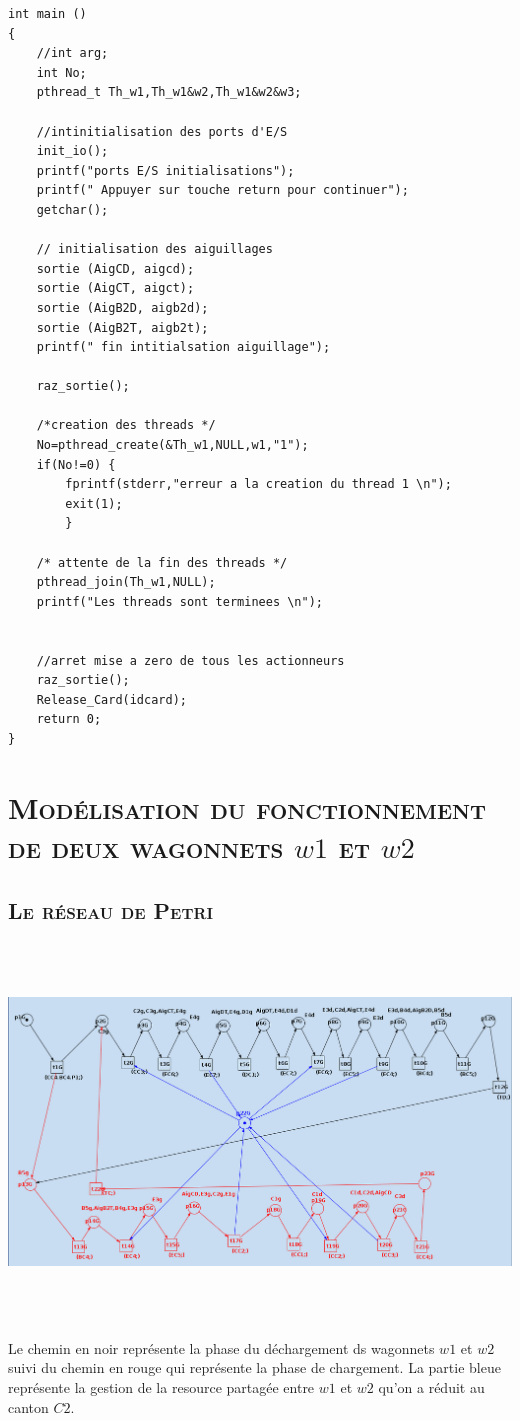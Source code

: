 \begin{lstlisting}
int main ()
{
	//int arg;
	int No;
	pthread_t Th_w1,Th_w1&w2,Th_w1&w2&w3;
	
	//intinitialisation des ports d'E/S
	init_io();
	printf("ports E/S initialisations");
	printf(" Appuyer sur touche return pour continuer");
	getchar();

	// initialisation des aiguillages
	sortie (AigCD, aigcd);
	sortie (AigCT, aigct);	
	sortie (AigB2D, aigb2d);
	sortie (AigB2T, aigb2t);
	printf(" fin intitialsation aiguillage");

	raz_sortie();
	
	/*creation des threads */
	No=pthread_create(&Th_w1,NULL,w1,"1");
	if(No!=0) {
		fprintf(stderr,"erreur a la creation du thread 1 \n");
		exit(1);
		}
		
	/* attente de la fin des threads */
	pthread_join(Th_w1,NULL);
	printf("Les threads sont terminees \n");
	
	
	//arret mise a zero de tous les actionneurs
	raz_sortie();
	Release_Card(idcard);
	return 0;
}
	\end{lstlisting}

	
\chapter{\textsc{ Modélisation du fonctionnement de deux wagonnets $w1$ et $w2$ }}
\section{\textsc{Le réseau de Petri}}
	
	\begin{center}
	\includegraphics[width=15cm, height=10cm]{w2.png}
	\label{fig2} 
	\end{center} 
	\par Le chemin en noir représente la phase du déchargement ds wagonnets $w1$ et $w2$  suivi du chemin  en rouge qui représente la phase de chargement. La partie bleue représente la gestion de la resource partagée entre $w1$ et $w2$ qu'on a réduit au canton $C2$.  


